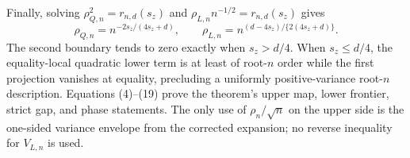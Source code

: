 Finally, solving \(\rho_{Q,n}^2=r_{n,d}(s_z)\) and \(\rho_{L,n}n^{-1/2}=r_{n,d}(s_z)\) gives
\[
\rho_{Q,n}=n^{-2s_z/(4s_z+d)},
\qquad
\rho_{L,n}=n^{(d-4s_z)/\{2(4s_z+d)\}}.                                        \tag{19}
\]
The second boundary tends to zero exactly when \(s_z>d/4\).  When \(s_z\le d/4\), the equality-local quadratic lower term is at least of root-\(n\) order while the first projection vanishes at equality, precluding a uniformly positive-variance root-\(n\) description.  Equations (4)--(19) prove the theorem's upper map, lower frontier, strict gap, and phase statements.  The only use of \(\rho_n/\sqrt n\) on the upper side is the one-sided variance envelope from the corrected expansion; no reverse inequality for \(V_{L,n}\) is used.